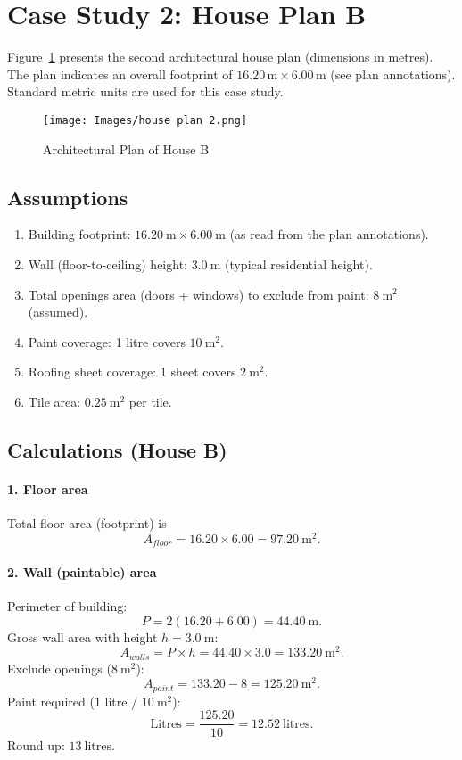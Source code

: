 \documentclass[12pt,a4paper,openany,titlepage,reqno, final]{report}
\theoremstyle{definition}
\begin{document}
	\section{Case Study 2: House Plan B}
	Figure~\ref{fig:house2} presents the second architectural house plan (dimensions in metres). The plan indicates an overall footprint of $16.20\,\text{m}\times6.00\,\text{m}$ (see plan annotations). Standard metric units are used for this case study.
	
	\begin{figure}[h!]
		\centering
		\texttt{[image: Images/house plan 2.png]}
		\caption{Architectural Plan of House B}
		\label{fig:house2}
	\end{figure}
	
	\subsection{Assumptions}
	\begin{enumerate}
		\item Building footprint: $16.20\ \text{m} \times 6.00\ \text{m}$ (as read from the plan annotations).
		\item Wall (floor-to-ceiling) height: $3.0\ \text{m}$ (typical residential height).
		\item Total openings area (doors + windows) to exclude from paint: $8\ \text{m}^2$ (assumed).
		\item Paint coverage: 1 litre covers $10\ \text{m}^2$.
		\item Roofing sheet coverage: 1 sheet covers $2\ \text{m}^2$.
		\item Tile area: $0.25\ \text{m}^2$ per tile.
	\end{enumerate}
	
	\subsection{Calculations (House B)}
	
	\paragraph{1. Floor area}
	Total floor area (footprint) is
	\[
	A_{floor} = 16.20\times6.00 = 97.20\ \text{m}^2.
	\]
	
	\paragraph{2. Wall (paintable) area}
	Perimeter of building:
	\[
	P = 2(16.20 + 6.00) = 44.40\ \text{m}.
	\]
	Gross wall area with height $h=3.0\ \text{m}$:
	\[
	A_{walls} = P\times h = 44.40\times3.0 = 133.20\ \text{m}^2.
	\]
	Exclude openings ($8\ \text{m}^2$):
	\[
	A_{paint} = 133.20 - 8 = 125.20\ \text{m}^2.
	\]
	Paint required (1 litre / $10\ \text{m}^2$):
	\[
	\text{Litres} = \frac{125.20}{10} = 12.52\ \text{litres}.
	\]
	Round up: \(\boxed{13\ \text{litres}}\).
	
\end{document}
